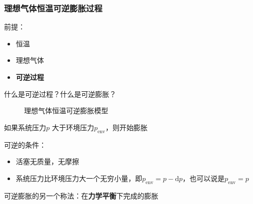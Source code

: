 \subsubsection*{理想气体恒温可逆膨胀过程}%
\label{subsub:理想气体恒温可逆膨胀过程}
前提：
\begin{itemize}
    \item 恒温
    \item 理想气体
    \item \textbf{可逆过程}
\end{itemize}
\begin{question}
什么是可逆过程？什么是可逆膨胀？
\end{question}
\begin{figure}[ht!]
    \centering
    \caption{理想气体恒温可逆膨胀模型}
    \label{fig:理想气体恒温可逆膨胀模型}
\end{figure}
如果系统压力$p$ 大于环境压力$p_\text{env}$，则开始膨胀

可逆的条件：
\begin{itemize}
    \item 活塞无质量，无摩擦
    \item 系统压力比环境压力大一个无穷小量，即$p_\text{env} = p-\mathrm{d}p$，也可以说是$p_\text{env}=p$
    
\end{itemize}
可逆膨胀的另一个称法：在\textbf{力学平衡}下完成的膨胀

